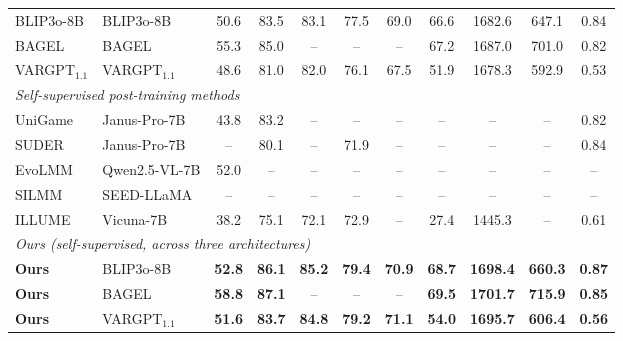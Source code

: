 \begin{table}[!htb]
{\begin{tabular}{@{}llcccccccc|c@{}}
    BLIP3o-8B & BLIP3o-8B & 50.6 & 83.5 & 83.1 & 77.5 & 69.0 & 66.6 & 1682.6 & 647.1 & 0.84 \\
    BAGEL & BAGEL & 55.3 & 85.0 & -- & -- & -- & 67.2 & 1687.0 & 701.0 & 0.82 \\
    VARGPT$_{1.1}$ & VARGPT$_{1.1}$ & 48.6 & 81.0 & 82.0 & 76.1 & 67.5 & 51.9 & 1678.3 & 592.9 & 0.53 \\
    \midrule
    \multicolumn{11}{l}{\emph{Self-supervised post-training methods}} \\
    UniGame \cite{su2025unigame} & Janus-Pro-7B & 43.8 & 83.2 & -- & -- & -- & -- & -- & -- & 0.82 \\
    SUDER \cite{hong2025dualselfrewards} & Janus-Pro-7B & -- & 80.1 & -- & 71.9 & -- & -- & -- & -- & 0.84 \\
    EvoLMM \cite{thawakar2025evolmm} & Qwen2.5-VL-7B & 52.0 & -- & -- & -- & -- & -- & -- & -- & -- \\
    SILMM \cite{qu2024silmm} & SEED-LLaMA & -- & -- & -- & -- & -- & -- & -- & -- & -- \\
    ILLUME \cite{wang2024illume} & Vicuna-7B & 38.2 & 75.1 & 72.1 & 72.9 & -- & 27.4 & 1445.3 & -- & 0.61 \\
    \midrule
    \multicolumn{11}{l}{\emph{Ours (self-supervised, across three architectures)}} \\
    \textbf{Ours} & BLIP3o-8B & \textbf{52.8} & \textbf{86.1} & \textbf{85.2} & \textbf{79.4} & \textbf{70.9} & \textbf{68.7} & \textbf{1698.4} & \textbf{660.3} & \textbf{0.87} \\
    \textbf{Ours} & BAGEL & \textbf{58.8} & \textbf{87.1} & -- & -- & -- & \textbf{69.5} & \textbf{1701.7} & \textbf{715.9} & \textbf{0.85} \\
    \textbf{Ours} & VARGPT$_{1.1}$ & \textbf{51.6} & \textbf{83.7} & \textbf{84.8} & \textbf{79.2} & \textbf{71.1} & \textbf{54.0} & \textbf{1695.7} & \textbf{606.4} & \textbf{0.56} \\
    \bottomrule
  \end{tabular}%
  }
\end{table}



